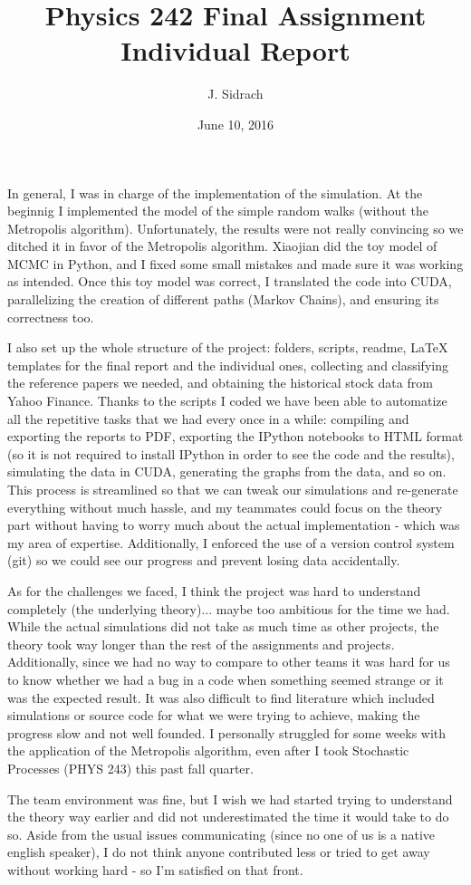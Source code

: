 \documentclass{article}
\title{Physics 242 Final Assignment\\Individual Report}
\author{J. Sidrach}
\date{June 10, 2016}
\begin{document}
\maketitle

In general, I was in charge of the implementation of the simulation.
At the beginnig I implemented the model of the simple random walks (without the Metropolis algorithm).
Unfortunately, the results were not really convincing so we ditched it in favor of the Metropolis algorithm.
Xiaojian did the toy model of MCMC in Python, and I fixed some small mistakes and made sure it was working as intended.
Once this toy model was correct, I translated the code into CUDA, parallelizing the creation of different paths (Markov Chains), and ensuring its correctness too.

I also set up the whole structure of the project: folders, scripts, readme, LaTeX templates for the final report and the individual ones, collecting and classifying the reference papers we needed, and obtaining the historical stock data from Yahoo Finance.
Thanks to the scripts I coded we have been able to automatize all the repetitive tasks that we had every once in a while: compiling and exporting the reports to PDF, exporting the IPython notebooks to HTML format (so it is not required to install IPython in order to see the code and the results), simulating the data in CUDA, generating the graphs from the data, and so on.
This process is streamlined so that we can tweak our simulations and re-generate everything without much hassle, and my teammates could focus on the theory part without having to worry much about the actual implementation - which was my area of expertise.
Additionally, I enforced the use of a version control system (git) so we could see our progress and prevent losing data accidentally.

As for the challenges we faced, I think the project was hard to understand completely (the underlying theory)... maybe too ambitious for the time we had.
While the actual simulations did not take as much time as other projects, the theory took way longer than the rest of the assignments and projects.
Additionally, since we had no way to compare to other teams it was hard for us to know whether we had a bug in a code when something seemed strange or it was the expected result.
It was also difficult to find literature which included simulations or source code for what we were trying to achieve, making the progress slow and not well founded.
I personally struggled for some weeks with the application of the Metropolis algorithm, even after I took Stochastic Processes (PHYS 243) this past fall quarter.

The team environment was fine, but I wish we had started trying to understand the theory way earlier and did not underestimated the time it would take to do so.
Aside from the usual issues communicating (since no one of us is a native english speaker), I do not think anyone contributed less or tried to get away without working hard - so I'm satisfied on that front.
\end{document}
